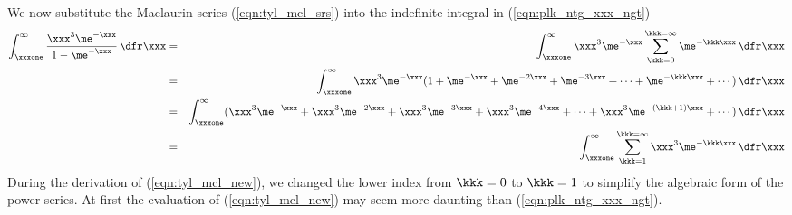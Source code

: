 \documentclass[12pt]{article}
\begin{document}
We now substitute the Maclaurin series (\ref{eqn:tyl_mcl_srs}) into 
the indefinite integral in (\ref{eqn:plk_ntg_xxx_ngt})
\begin{eqnarray}
\int_{\xxxone}^{\infty} 
\frac{\xxx^{3}\me^{-\xxx}}{1 - \me^{-\xxx}} \,\dfr\xxx
& = &
\int_{\xxxone}^{\infty} \xxx^{3}\me^{-\xxx} \sum_{\kkk=0}^{\kkk=\infty} \me^{-\kkk\xxx} \,\dfr\xxx \nonumber \\
& = &
\int_{\xxxone}^{\infty} \xxx^{3}\me^{-\xxx} ( 1 + \me^{-\xxx} + \me^{-2\xxx} + \me^{-3\xxx} + \cdots + \me^{-\kkk\xxx} + \cdots ) \,\dfr\xxx \nonumber \\
& = &
\int_{\xxxone}^{\infty} ( \xxx^{3}\me^{-\xxx} + \xxx^{3}\me^{-2\xxx} + \xxx^{3}\me^{-3\xxx} + \xxx^{3}\me^{-4\xxx} + \cdots + \xxx^{3}\me^{-(\kkk+1)\xxx} + \cdots ) \,\dfr\xxx \nonumber \\
& = &
\int_{\xxxone}^{\infty} \sum_{\kkk=1}^{\kkk=\infty} \xxx^{3}\me^{-\kkk\xxx} \,\dfr\xxx  
\label{eqn:tyl_mcl_new}
\end{eqnarray}
During the derivation of (\ref{eqn:tyl_mcl_new}), we changed the lower index from 
$\kkk = 0$ to $\kkk = 1$ to simplify the algebraic form of the power series.
At first the evaluation of (\ref{eqn:tyl_mcl_new}) may seem more daunting than
(\ref{eqn:plk_ntg_xxx_ngt}).
\end{document}
